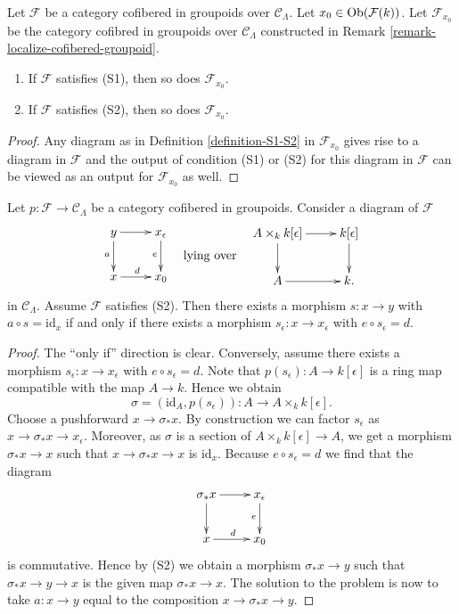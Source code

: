 \begin{lemma}
\label{lemma-S1-S2-localize}
Let $\mathcal{F}$ be a category cofibered in groupoids over
$\mathcal{C}_\Lambda$. Let $x_0 \in \mathop{\mathrm{Ob}}\nolimits(\mathcal{F}(k))$.
Let $\mathcal{F}_{x_0}$ be the category cofibred in groupoids over
$\mathcal{C}_\Lambda$ constructed in
Remark \ref{remark-localize-cofibered-groupoid}.
\begin{enumerate}
\item If $\mathcal{F}$ satisfies (S1), then so does $\mathcal{F}_{x_0}$.
\item If $\mathcal{F}$ satisfies (S2), then so does $\mathcal{F}_{x_0}$.
\end{enumerate}
\end{lemma}

\begin{proof}
Any diagram as in
Definition \ref{definition-S1-S2}
in $\mathcal{F}_{x_0}$ gives rise to a diagram in $\mathcal{F}$
and the output of condition (S1) or (S2) for this diagram in $\mathcal{F}$
can be viewed as an output for $\mathcal{F}_{x_0}$ as well.
\end{proof}

\begin{lemma}
\label{lemma-lifting-section}
Let $p: \mathcal{F} \to \mathcal{C}_\Lambda$ be a category cofibered in
groupoids. Consider a diagram of $\mathcal{F}$
$$
\vcenter{
\xymatrix{
y \ar[r] \ar[d]_a & x_\epsilon \ar[d]_e \\
x \ar[r]^d        & x_0
}
}
\quad\text{lying over}\quad
\vcenter{
\xymatrix{
A \times_k k[\epsilon] \ar[r] \ar[d] & k[\epsilon] \ar[d] \\
A \ar[r] & k.
}
}
$$
in $\mathcal{C}_\Lambda$. Assume $\mathcal{F}$ satisfies (S2).
Then there exists a morphism $s : x \to y$ with $a \circ s = \text{id}_x$
if and only if there exists a morphism $s_\epsilon : x \to x_\epsilon$
with $e \circ s_\epsilon = d$.
\end{lemma}

\begin{proof}
The ``only if'' direction is clear.  Conversely, assume there exists a
morphism $s_\epsilon : x \to x_\epsilon$ with $e \circ s_\epsilon = d$.
Note that $p(s_\epsilon) : A \to k[\epsilon]$ is a ring map compatible
with the map $A \to k$. Hence we obtain
$$
\sigma = (\text{id}_A, p(s_\epsilon)) : A \to A \times_k k[\epsilon].
$$
Choose a pushforward $x \to \sigma_*x$. By construction we can factor
$s_\epsilon$ as $x \to \sigma_*x \to x_\epsilon$. Moreover, as $\sigma$
is a section of $A \times_k k[\epsilon] \to A$, we get a morphism
$\sigma_*x \to x$ such that $x \to \sigma_*x \to x$ is $\text{id}_x$.
Because $e \circ s_\epsilon = d$ we find that the diagram
$$
\xymatrix{
\sigma_*x \ar[r] \ar[d] & x_\epsilon \ar[d]_e \\
x \ar[r]^d        & x_0
}
$$
is commutative. Hence by (S2) we obtain a morphism $\sigma_*x \to y$
such that $\sigma_*x \to y \to x$ is the given map $\sigma_*x \to x$.
The solution to the problem is now to take $a : x \to y$ equal to
the composition $x \to \sigma_*x \to y$.
\end{proof}

